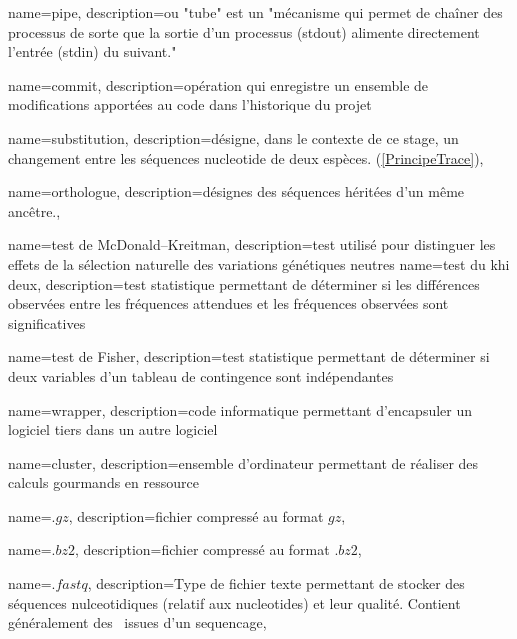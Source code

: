  {
    name=pipe,
    description={ou "tube" est un "mécanisme qui permet de chaîner des processus de sorte que la sortie d'un processus (stdout) alimente directement l'entrée (stdin) du suivant." \cite{LeDico}}
}
\newcommand{\pipe}{\gls{pipe}}

 {
    name=commit,
    description={opération qui enregistre un ensemble de modifications apportées au code dans l'historique du projet}
}


 {
    name=substitution,
    description={désigne, dans le contexte de ce stage, un changement entre les séquences nucleotide de deux espèces. (\cref{PrincipeTrace})},
}

 {
    name=orthologue,
    description={désignes des séquences héritées d'un même ancêtre.},
}

 {
    name=test de McDonald–Kreitman,
    description={test utilisé pour distinguer les effets de la sélection naturelle des variations génétiques neutres}
}
 {
    name=test du khi deux,
    description={test statistique permettant de déterminer si les différences observées entre les fréquences attendues et les fréquences observées sont significatives}
}

 {
    name=test de Fisher,
    description={test statistique permettant de déterminer si deux variables d'un tableau de contingence sont indépendantes}
}

 {
    name=wrapper,
    description={code informatique permettant d'encapsuler un logiciel tiers dans un autre logiciel}
}

 {
    name=cluster,
    description={ensemble d'ordinateur permettant de réaliser des calculs gourmands en ressource}
}

 {
    name=$.gz$,
    description={fichier compressé au format $gz$},
}
\newcommand{\gz}{"\gls{gz}"}

 {
    name=$.bz2$,
    description={fichier compressé au format $.bz2$},
}
\newcommand{\bz}{"\gls{bz}"}


 {
    name=$.fastq$,
    description={Type de fichier texte permettant de stocker des séquences nulceotidiques (relatif aux \glspl{nucleotide}) et leur qualité. Contient généralement des \reads issues d'un \gls{sequencage}},
}
\newcommand{\fastq}{"\gls{fastq}"}


